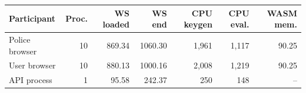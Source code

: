 \begin{tabular}{lrrrrrr}
\hline
Participant & Proc. & WS loaded & WS end & CPU keygen & CPU eval. & WASM mem. \\
\hline
Police browser & 10 & 869.34 & 1060.30 & 1,961 & 1,117 & 90.25 \\
User browser & 10 & 880.13 & 1000.16 & 2,008 & 1,219 & 90.25 \\
API process & 1 & 95.58 & 242.37 & 250 & 148 & -- \\
\hline
\end{tabular}
